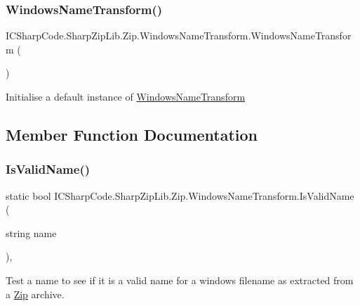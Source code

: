 \subsubsection{\texorpdfstring{Windows\+Name\+Transform()}{WindowsNameTransform()}\hspace{0.1cm}{\footnotesize\ttfamily [2/2]}}
{\footnotesize\ttfamily I\+C\+Sharp\+Code.\+Sharp\+Zip\+Lib.\+Zip.\+Windows\+Name\+Transform.\+Windows\+Name\+Transform (\begin{DoxyParamCaption}{ }\end{DoxyParamCaption})\hspace{0.3cm}{\ttfamily [inline]}}



Initialise a default instance of \hyperlink{class_i_c_sharp_code_1_1_sharp_zip_lib_1_1_zip_1_1_windows_name_transform}{Windows\+Name\+Transform} 



\subsection{Member Function Documentation}
\mbox{\label{class_i_c_sharp_code_1_1_sharp_zip_lib_1_1_zip_1_1_windows_name_transform_a0bcbd4b7a2b1e8dc292da72739efcb37}} 
\subsubsection{\texorpdfstring{Is\+Valid\+Name()}{IsValidName()}}
{\footnotesize\ttfamily static bool I\+C\+Sharp\+Code.\+Sharp\+Zip\+Lib.\+Zip.\+Windows\+Name\+Transform.\+Is\+Valid\+Name (\begin{DoxyParamCaption}\item[{string}]{name }\end{DoxyParamCaption})\hspace{0.3cm}{\ttfamily [inline]}, {\ttfamily [static]}}



Test a name to see if it is a valid name for a windows filename as extracted from a \hyperlink{namespace_i_c_sharp_code_1_1_sharp_zip_lib_1_1_zip}{Zip} archive. 


